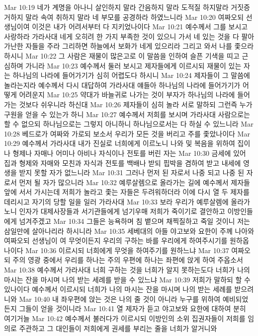 Mar 10:19  네가 계명을 아나니 살인하지 말라 간음하지 말라 도적질 하지말라 거짓증거하지 말라 속여 취하지 말라 네 부모를 공경하라 하였느니라
Mar 10:20  여짜오되 선생님이여 이것은 내가 어려서부터 다 지키었나이다
Mar 10:21  예수께서 그를 보시고 사랑하라 가라사대 네게 오히려 한 가지 부족한 것이 있으니 가서 네 있는 것을 다 팔아 가난한 자들을 주라 그리하면 하늘에서 보화가 네게 있으리라 그리고 와서 나를 좇으라 하시니
Mar 10:22  그 사람은 재물이 많은고로 이 말씀을 인하여 슬픈 기색을 띠고 근심하며 가니라
Mar 10:23  예수께서 둘러 보시고 제자들에게 이르시되 재물이 있는 자는 하나님의 나라에 들어가기가 심히 어렵도다 하시니
Mar 10:24  제자들이 그 말씀에 놀라는지라 예수께서 다시 대답하여 가라사대 얘들아 하나님의 나라에 들어가기가 어떻게 어려운지
Mar 10:25  약대가 바늘귀로 나가는 것이 부자가 하나님의 나라에 들어가는 것보다 쉬우니라 하신대
Mar 10:26  제자들이 심히 놀라 서로 말하되 그런즉 누가 구원을 얻을 수 있는가 하니
Mar 10:27  예수께서 저희를 보시며 가라사대 사람으로는 할 수 없으되 하나님으로는 그렇지 아니하니 하나님으로서는 다 하실 수 있느니라
Mar 10:28  베드로가 여짜와 가로되 보소서 우리가 모든 것을 버리고 주를 좇았나이다
Mar 10:29  예수께서 가라사대 내가 진실로 너희에게 이르노니 나와 및 복음을 위하여 집이나 형제나 자매나 어미나 아비나 자식이나 전토를 버린 자는
Mar 10:30  금세에 있어 집과 형제와 자매와 모친과 자식과 전토를 백배나 받되 핍박을 겸하여 받고 내세에 영생을 받지 못할 자가 없느니라
Mar 10:31  그러나 먼저 된 자로서 나중 되고 나중 된 자로서 먼저 될 자가 많으니라
Mar 10:32  예루살렘으로 올라가는 길에 예수께서 제자들 앞에 서서 가시는데 저희가 놀라고 좇는 자들은 두려워하더라 이에 다시 열 두 제자를 데리시고 자기의 당할 일을 일러 가라사대
Mar 10:33  보라 우리가 예루살렘에 올라가노니 인자가 대제사장들과 서기관들에게 넘기우매 저희가 죽이기로 결안하고 이방인들에게 넘겨주겠고
Mar 10:34  그들은 능욕하며 침 뱉으며 채찍질하고 죽일 것이니 저는 삼일만에 살아나리라 하시니라
Mar 10:35  세베대의 아들 야고보와 요한이 주께 나아와 여짜오되 선생님이 여 무엇이든지 우리의 구하는 바를 우리에게 하여주시기를 원하옵나이다
Mar 10:36  이르시되 너희에게 무엇을 하여주기를 원하느냐
Mar 10:37  여짜오되 주의 영광 중에서 우리를 하나는 주의 우편에 하나는 좌편에 앉게 하여 주옵소서
Mar 10:38  예수께서 가라사대 너희 구하는 것을 너희가 알지 못하는도다 너희가 나의 마시는 잔을 마시며 나의 받는 세례를 받을 수 있느냐
Mar 10:39  저희가 말하되 할 수 있나이다 예수께서 이르시되 너희가 나의 마시는 잔을 마시며 나의 받는 세례를 받으려니와
Mar 10:40  내 좌우편에 앉는 것은 나의 줄 것이 아니라 누구를 위하여 예비되었든지 그들이 얻을 것이니라
Mar 10:41  열 제자가 듣고 야고보와 요한에 대하여 분히 여기거늘
Mar 10:42  예수께서 불러다가 이르시되 이방인의 소위 집권자들이 저희를 임의로 주관하고 그 대인들이 저희에게 권세를 부리는 줄을 너희가 알거니와
